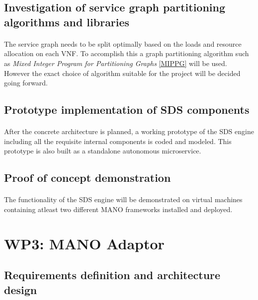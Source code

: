 \subsection{Investigation of service graph partitioning algorithms and libraries}
\paragraph{}
The service graph needs to be split optimally based on the loads and resource allocation on each VNF. To accomplish this a graph partitioning algorithm such as \textit{Mixed Integer Program for Partitioning Graphs} \ref{MIPPG} will be used. However the exact choice of algorithm suitable for the project will be decided going forward.
\subsection{Prototype implementation of SDS components}
\paragraph{}
After the concrete architecture is planned, a working prototype of the SDS engine including all the requisite internal components is coded and modeled. This prototype is also built as a standalone autonomous microservice.
\subsection{Proof of concept demonstration}
\paragraph{}
The functionality of the SDS engine will be demonstrated on virtual machines containing atleast two different MANO frameworks installed and deployed. 

\section{WP3: MANO Adaptor}

\subsection{Requirements definition and architecture design}
\paragraph{}

